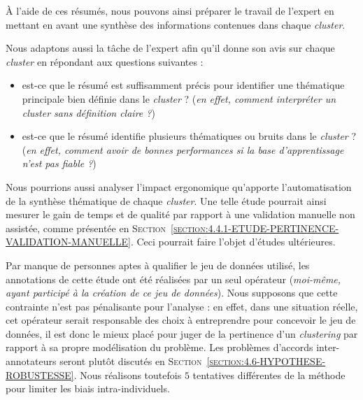 			À l'aide de ces résumés, nous pouvons ainsi préparer le travail de l'expert en mettant en avant une synthèse des informations contenues dans chaque \textit{cluster}.
			
			Nous adaptons aussi la tâche de l'expert afin qu'il donne son avis sur chaque \textit{cluster} en répondant aux questions suivantes :
			\begin{itemize}
				\item est-ce que le résumé est suffisamment précis pour identifier une thématique principale bien définie dans le \textit{cluster} ? (\textit{en effet, comment interpréter un \textit{cluster} sans définition claire ?})
				\item est-ce que le résumé identifie plusieurs thématiques ou bruits dans le \textit{cluster} ? (\textit{en effet, comment avoir de bonnes performances si la base d'apprentissage n'est pas fiable ?})
			\end{itemize}
			
			\begin{leftBarIdea}
				Nous pourrions aussi analyser l'impact ergonomique qu'apporte l'automatisation de la synthèse thématique de chaque \textit{cluster}.
				Une telle étude pourrait ainsi mesurer le gain de temps et de qualité par rapport à une validation manuelle non assistée, comme présentée en \textsc{Section~\ref{section:4.4.1-ETUDE-PERTINENCE-VALIDATION-MANUELLE}}.
				Ceci pourrait faire l'objet d'études ultérieures.
			\end{leftBarIdea}
			
			\begin{leftBarWarning}
				Par manque de personnes aptes à qualifier le jeu de données utilisé, les annotations de cette étude ont été réalisées par un seul opérateur (\textit{moi-même, ayant participé à la création de ce jeu de données}).
				Nous supposons que cette contrainte n'est pas pénalisante pour l'analyse : en effet, dans une situation réelle, cet opérateur serait responsable des choix à entreprendre pour concevoir le jeu de données, il est donc le mieux placé pour juger de la pertinence d'un \textit{clustering} par rapport à sa propre modélisation du problème.
				Les problèmes d'accords inter-annotateurs seront plutôt discutés en \textsc{Section~\ref{section:4.6-HYPOTHESE-ROBUSTESSE}}.
				Nous réalisons toutefois $5$ tentatives différentes de la méthode pour limiter les biais intra-individuels.
			\end{leftBarWarning}
			

